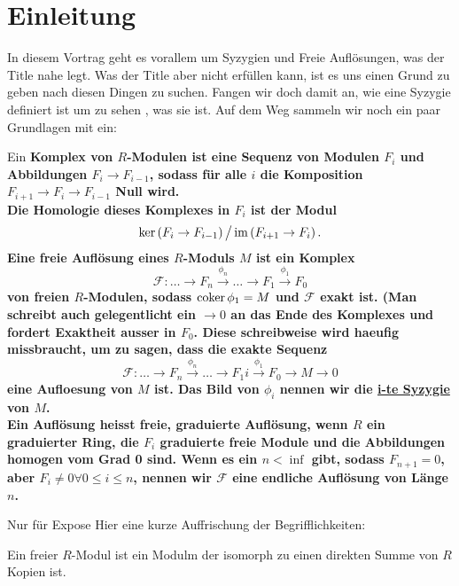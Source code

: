\documentclass{article}
\begin{document}
\section{Einleitung}
	In diesem Vortrag geht es vorallem um Syzygien und Freie Aufl\"osungen, 
	was der Title nahe legt.
	Was der Title aber nicht erf\"ullen kann, 
	ist es uns einen Grund zu geben nach diesen Dingen zu suchen.
	Fangen wir doch damit an, 
	wie eine Syzygie definiert ist um zu sehen
	, was sie ist.
	Auf dem Weg sammeln wir noch ein paar Grundlagen mit ein:
	\begin{defn}[\nocite{Eis1} ]
		Ein \bf{Komplex von \( R \)-Modulen} 
		ist eine Sequenz von Modulen 
		\( F_{i} \)
		und Abbildungen
		\( F_{i} \to F_{i-1} \),
		sodass f\"ur alle 
		\( i \) 
		die Komposition
		\( F_{i+1} \to F_{i} \to F_{i-1} \)
		Null wird. \\
		Die \bf{Homologie} dieses Komplexes in 
		\( F_{i} \)
		ist der  Modul
		\[
			\ker\left( F_{i} \to F_{i-1 } \right) \big/ \operatorname{im} \left( F_{i+1} \to F_{i} \right).
		\]		
		Eine \bf{freie Aufl\"osung} eines 
		\(R\)-Moduls 
		\(M\)
		ist ein Komplex
		\[
			\mathcal{F}: \dots \to F_{n} 
			\overset{\phi_{n}}{\to} 
			\dots \to F_{1}
			\overset{\phi_{1}}{\to} F_{0}
		\]
		von freien
		\(R\)-Modulen, sodass 
		\( \operatorname{coker} \phi_{1} = M \)
		und
		\( \mathcal{F} \)
		exakt ist.
		(Man schreibt auch gelegentlicht ein 
		\( \to 0 \) 
		an das Ende des Komplexes
		und fordert Exaktheit ausser in 
		\( F_{0} \).
		Diese schreibweise wird haeufig missbraucht,
		um zu sagen, 
		dass die exakte Sequenz
		\[
			\mathcal{F}: \dots \to F_{n} 
			\overset{\phi_{n}}{\to} 
			\dots \to F_{1}i
			\overset{\phi_{1}}{\to} F_{0}
			\to M 
			\to 0
		\]
		eine Aufloesung von 
		\(M \)
		ist.
		Das Bild von
		\( \phi_{i} \)
		nennen wir die
		\underline{i-te Syzygie} 
		von 
		\( M \).\\
		Ein Aufl\"osung heisst freie, graduierte Aufl\"osung,
		wenn 
		\( R \) ein graduierter Ring,
		die 
		\( F_{i} \)
		graduierte freie Module
		und die Abbildungen homogen vom Grad 0 sind.
		Wenn es ein
		\( n < \inf \) 
		gibt, sodass 
		\(F_{n+1}=0 \),
		aber 
		\( F_{i} \neq 0 \forall 0 \le i \le n \),
		nennen wir 
		\( \mathcal{F} \) 
		eine endliche Aufl\"osung von L\"ange 
		\( n \).
	\end{defn}
	{\color{red}Nur f\"ur Expose}
	Hier eine kurze Auffrischung der Begrifflichkeiten:
	\begin{defn}
		Ein freier 
		\(R\)-Modul
		ist ein Modulm der isomorph zu einen direkten Summe von 
		\( R \)
		Kopien ist.
	\end{defn}
\end{document}
